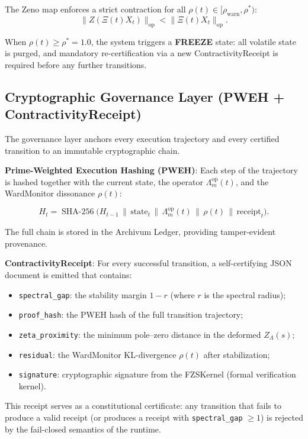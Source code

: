 \documentclass[12pt]{article}
\theoremstyle{plain}
\theoremstyle{definition}
\theoremstyle{remark}
\begin{document}
The Zeno map enforces a strict contraction for all $\rho(t) \in [\rho_{\text{warn}}, \rho^*)$:
\[
\|Z(\Xi(t)X_t)\|_{\text{op}} < \|\Xi(t)X_t\|_{\text{op}}.
\]

When $\rho(t) \geq \rho^* = 1.0$, the system triggers a \textbf{FREEZE} state: all volatile state is purged, and mandatory re-certification via a new ContractivityReceipt is required before any further transitions.

\subsection{Cryptographic Governance Layer (PWEH + ContractivityReceipt)}

The governance layer anchors every execution trajectory and every certified transition to an immutable cryptographic chain.

\textbf{Prime-Weighted Execution Hashing (PWEH)}: Each step of the trajectory is hashed together with the current state, the operator $\Lambda_m^{\text{op}}(t)$, and the WardMonitor dissonance $\rho(t)$:

\[
H_t = \operatorname{SHA\text{-}256}\bigl( H_{t-1} \,\|\, \text{state}_t \,\|\, \Lambda_m^{\text{op}}(t) \,\|\, \rho(t) \,\|\, \text{receipt}_t \bigr).
\]

The full chain is stored in the Archivum Ledger, providing tamper-evident provenance.

\textbf{ContractivityReceipt}: For every successful transition, a self-certifying JSON document is emitted that contains:
\begin{itemize}
    \item \texttt{spectral\_gap}: the stability margin $1 - r$ (where $r$ is the spectral radius);
    \item \texttt{proof\_hash}: the PWEH hash of the full transition trajectory;
    \item \texttt{zeta\_proximity}: the minimum pole–zero distance in the deformed $Z_\Lambda(s)$;
    \item \texttt{residual}: the WardMonitor KL-divergence $\rho(t)$ after stabilization;
    \item \texttt{signature}: cryptographic signature from the FZSKernel (formal verification kernel).
\end{itemize}

This receipt serves as a constitutional certificate: any transition that fails to produce a valid receipt (or produces a receipt with \texttt{spectral\_gap} $\geq 1$) is rejected by the fail-closed semantics of the runtime.
\end{document}
